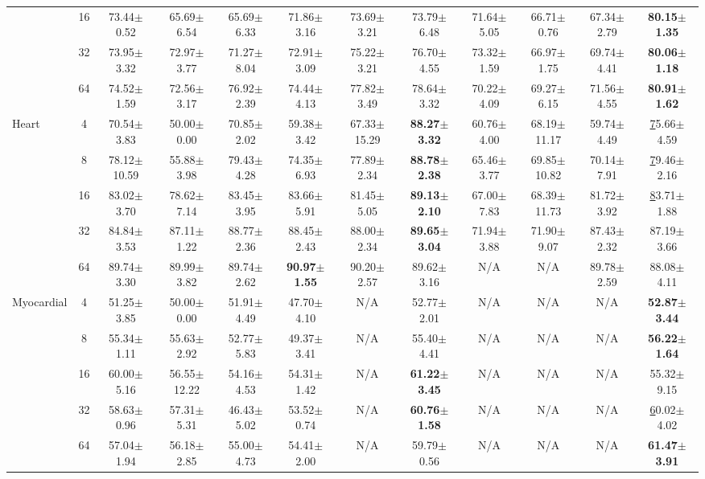 \documentclass{article}
\theoremstyle{plain}
\theoremstyle{definition}
\theoremstyle{remark}
\begin{document}
\begin{table}[h!]
{\begin{tabular}{@{}lccccccccccc@{}}
 & 16 & 73.44$\pm$0.52 & 65.69$\pm$6.54 & 65.69$\pm$6.33 & 71.86$\pm$3.16 & 73.69$\pm$3.21 & 73.79$\pm$6.48 & 71.64$\pm$5.05 & 66.71$\pm$0.76 & 67.34$\pm$2.79 & \textbf{80.15$\pm$1.35} \\
 & 32 & 73.95$\pm$3.32 & 72.97$\pm$3.77 & 71.27$\pm$8.04 & 72.91$\pm$3.09 & 75.22$\pm$3.21 & 76.70$\pm$4.55 & 73.32$\pm$1.59 & 66.97$\pm$1.75 & 69.74$\pm$4.41 & \textbf{80.06$\pm$1.18} \\
 & 64 & 74.52$\pm$1.59 & 72.56$\pm$3.17 & 76.92$\pm$2.39 & 74.44$\pm$4.13 & 77.82$\pm$3.49 & 78.64$\pm$3.32 & 70.22$\pm$4.09 & 69.27$\pm$6.15 & 71.56$\pm$4.55 & \textbf{80.91$\pm$1.62} \\ \hline
Heart & 4 & 70.54$\pm$3.83 & 50.00$\pm$0.00 & 70.85$\pm$2.02 & 59.38$\pm$3.42 & 67.33$\pm$15.29 & \textbf{88.27$\pm$3.32} & 60.76$\pm$4.00 & 68.19$\pm$11.17 & 59.74$\pm$4.49 & {\ul 75.66$\pm$4.59} \\
 & 8 & 78.12$\pm$10.59 & 55.88$\pm$3.98 & 79.43$\pm$4.28 & 74.35$\pm$6.93 & 77.89$\pm$2.34 & \textbf{88.78$\pm$2.38} & 65.46$\pm$3.77 & 69.85$\pm$10.82 & 70.14$\pm$7.91 & {\ul 79.46$\pm$2.16} \\
 & 16 & 83.02$\pm$3.70 & 78.62$\pm$7.14 & 83.45$\pm$3.95 & 83.66$\pm$5.91 & 81.45$\pm$5.05 & \textbf{89.13$\pm$2.10} & 67.00$\pm$7.83 & 68.39$\pm$11.73 & 81.72$\pm$3.92 & {\ul 83.71$\pm$1.88} \\
 & 32 & 84.84$\pm$3.53 & 87.11$\pm$1.22 & 88.77$\pm$2.36 & 88.45$\pm$2.43 & 88.00$\pm$2.34 & \textbf{89.65$\pm$3.04} & 71.94$\pm$3.88 & 71.90$\pm$9.07 & 87.43$\pm$2.32 & 87.19$\pm$3.66 \\
 & 64 & 89.74$\pm$3.30 & 89.99$\pm$3.82 & 89.74$\pm$2.62 & \textbf{90.97$\pm$1.55} & 90.20$\pm$2.57 & 89.62$\pm$3.16 & N/A & N/A & 89.78$\pm$2.59 & 88.08$\pm$4.11 \\ \hline
Myocardial & 4 & 51.25$\pm$3.85 & 50.00$\pm$0.00 & 51.91$\pm$4.49 & 47.70$\pm$4.10 & N/A & 52.77$\pm$2.01 & N/A & N/A & N/A & \textbf{52.87$\pm$3.44} \\
 & 8 & 55.34$\pm$1.11 & 55.63$\pm$2.92 & 52.77$\pm$5.83 & 49.37$\pm$3.41 & N/A & 55.40$\pm$4.41 & N/A & N/A & N/A & \textbf{56.22$\pm$1.64} \\
 & 16 & 60.00$\pm$5.16 & 56.55$\pm$12.22 & 54.16$\pm$4.53 & 54.31$\pm$1.42 & N/A & \textbf{61.22$\pm$3.45} & N/A & N/A & N/A & 55.32$\pm$9.15 \\
 & 32 & 58.63$\pm$0.96 & 57.31$\pm$5.31 & 46.43$\pm$5.02 & 53.52$\pm$0.74 & N/A & \textbf{60.76$\pm$1.58} & N/A & N/A & N/A & {\ul 60.02$\pm$4.02} \\
 & 64 & 57.04$\pm$1.94 & 56.18$\pm$2.85 & 55.00$\pm$4.73 & 54.41$\pm$2.00 & N/A & 59.79$\pm$0.56 & N/A & N/A & N/A & \textbf{61.47$\pm$3.91} \\ \hline

\end{tabular}}
\end{table}
\end{document}
